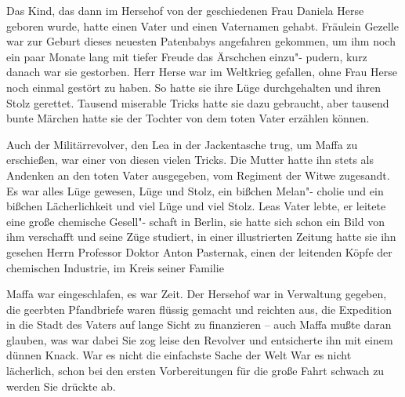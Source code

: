 Das Kind, das dann im Hersehof von der geschiedenen Frau
Daniela Herse geboren wurde, hatte einen Vater und einen
Vaternamen gehabt. Fräulein Gezelle war zur Geburt dieses
neuesten Patenbabys angefahren gekommen, um ihm noch
ein paar Monate lang mit tiefer Freude das Ärschchen einzu"-%
pudern, kurz danach war sie gestorben. Herr Herse war im
Weltkrieg gefallen, ohne Frau Herse noch einmal gestört zu
haben. So hatte sie ihre Lüge durchgehalten und ihren Stolz
gerettet. Tausend miserable Tricks hatte sie dazu gebraucht,
aber tausend bunte Märchen hatte sie der Tochter von dem
toten Vater erzählen können.

Auch der Militärrevolver, den Lea in der Jackentasche trug,
um Maffa zu erschießen, war einer von diesen vielen Tricks.
Die Mutter hatte ihn stets als Andenken an den toten Vater
ausgegeben, vom Regiment der Witwe zugesandt. Es war
alles Lüge gewesen, Lüge und Stolz, ein bißchen Melan"-%
cholie und ein bißchen Lächerlichkeit und viel Lüge und viel
Stolz. Leas Vater lebte, er leitete eine große chemische Gesell"-%
schaft in Berlin, sie hatte sich schon ein Bild von ihm verschafft
und seine Züge studiert, in einer illustrierten Zeitung hatte sie
ihn gesehen\dopp{} Herrn Professor Doktor Anton Pasternak, einen
der leitenden Köpfe der chemischen Industrie, im Kreis seiner
Familie\punkte{}

Maffa war eingeschlafen, es war Zeit. Der Hersehof war in
Verwaltung gegeben, die geerbten Pfandbriefe waren flüssig
gemacht und reichten aus, die Expedition in die Stadt des
Vaters auf lange Sicht zu finanzieren -- auch Maffa mußte
daran glauben, was war dabei\ausr{} Sie zog leise den Revolver
und entsicherte ihn mit einem dünnen Knack. War es nicht die
einfachste Sache der Welt\frag{} War es nicht lächerlich, schon bei
den ersten Vorbereitungen für die große Fahrt schwach zu
werden\frag{} Sie drückte ab.

